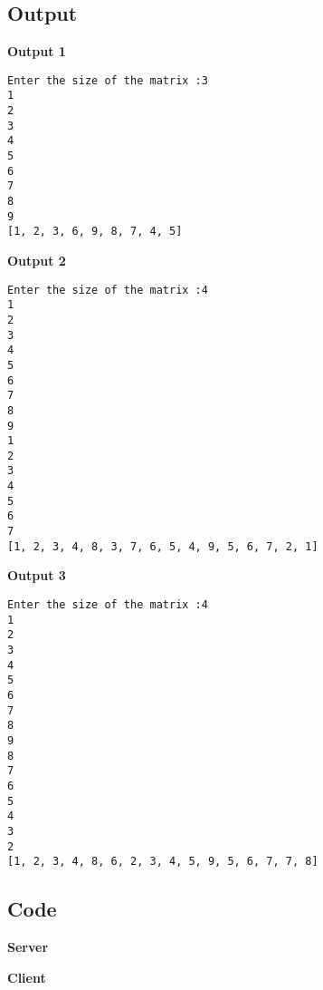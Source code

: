 \documentclass{article}
\begin{document}
    \subsection{Output}
            \textbf{Output 1}
            \begin{verbatim}
Enter the size of the matrix :3
1
2
3
4
5
6
7
8
9
[1, 2, 3, 6, 9, 8, 7, 4, 5]
        \end{verbatim}
        \textbf{Output 2}
        \begin{verbatim}
Enter the size of the matrix :4
1
2
3
4
5
6
7
8
9
1
2
3
4
5
6
7
[1, 2, 3, 4, 8, 3, 7, 6, 5, 4, 9, 5, 6, 7, 2, 1]    
        \end{verbatim}
      \textbf{Output 3}
      \begin{verbatim}
Enter the size of the matrix :4
1
2
3
4
5
6
7
8
9
8
7
6
5
4
3
2
[1, 2, 3, 4, 8, 6, 2, 3, 4, 5, 9, 5, 6, 7, 7, 8]  
      \end{verbatim}
    \subsection{Code}
    \textbf{Server}
    
    \vspace{1 cm}
    \textbf{Client}
    
    \vspace{1 cm}
 

         
\end{document}
